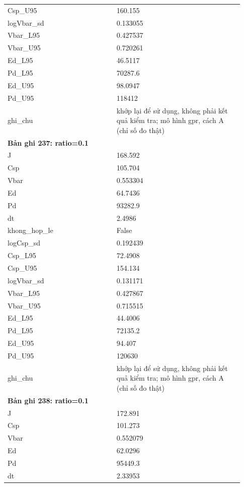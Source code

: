 \begin{longtable}{p{0.43\linewidth}p{0.50\linewidth}}
Csp\_\allowbreak U95 & 160.155 \\
logVbar\_\allowbreak sd & 0.133055 \\
Vbar\_\allowbreak L95 & 0.427537 \\
Vbar\_\allowbreak U95 & 0.720261 \\
Ed\_\allowbreak L95 & 46.5117 \\
Pd\_\allowbreak L95 & 70287.6 \\
Ed\_\allowbreak U95 & 98.0947 \\
Pd\_\allowbreak U95 & 118412 \\
ghi\_\allowbreak chu & khớp lại để sử dụng, không phải kết quả kiểm tra; mô hình gpr, cách A (chỉ số đo thật) \\
\midrule
\multicolumn{2}{p{0.95\linewidth}}{\textbf{Bản ghi 237: ratio=0.1}} \\
J & 168.592 \\
Csp & 105.704 \\
Vbar & 0.553304 \\
Ed & 64.7436 \\
Pd & 93282.9 \\
dt & 2.4986 \\
khong\_\allowbreak hop\_\allowbreak le & False \\
logCsp\_\allowbreak sd & 0.192439 \\
Csp\_\allowbreak L95 & 72.4908 \\
Csp\_\allowbreak U95 & 154.134 \\
logVbar\_\allowbreak sd & 0.131171 \\
Vbar\_\allowbreak L95 & 0.427867 \\
Vbar\_\allowbreak U95 & 0.715515 \\
Ed\_\allowbreak L95 & 44.4006 \\
Pd\_\allowbreak L95 & 72135.2 \\
Ed\_\allowbreak U95 & 94.407 \\
Pd\_\allowbreak U95 & 120630 \\
ghi\_\allowbreak chu & khớp lại để sử dụng, không phải kết quả kiểm tra; mô hình gpr, cách A (chỉ số đo thật) \\
\midrule
\multicolumn{2}{p{0.95\linewidth}}{\textbf{Bản ghi 238: ratio=0.1}} \\
J & 172.891 \\
Csp & 101.273 \\
Vbar & 0.552079 \\
Ed & 62.0296 \\
Pd & 95449.3 \\
dt & 2.33953 \\

\end{longtable}
